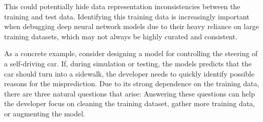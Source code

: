   This could potentially hide data representation inconsistencies between the training and test data.
  Identifying this training data is increasingly important when debugging deep neural network models due to their heavy reliance on large training datasets, which may not always be highly curated and consistent.


  As a concrete example, consider designing a model for controlling the steering of a self-driving car.
  If, during simulation or testing, the models predicts that the car should turn into a sidewalk, the developer needs to quickly identify possible reasons for the misprediction.
  Due to its strong dependence on the training data, there are three natural questions that arise:
  Answering these questions can help the developer focus on cleaning the training dataset, gather more training data, or augmenting the model.
\fi


